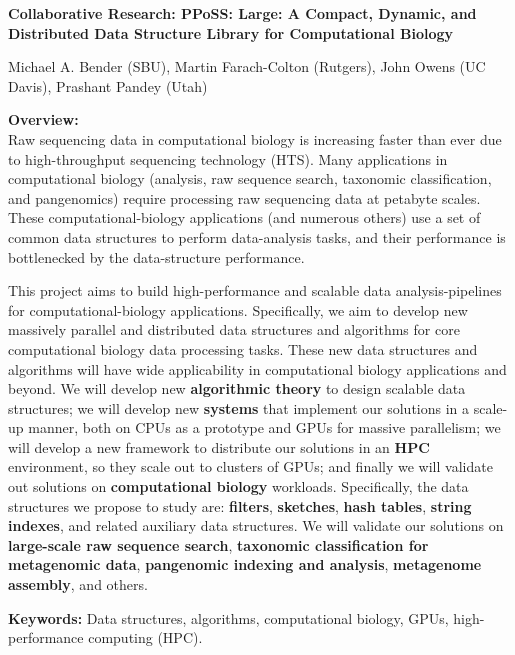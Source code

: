 
\begin{center}
\bf
\Large
Collaborative Research: PPoSS\@: Large: A Compact, Dynamic, and Distributed Data
Structure Library for Computational Biology

\medskip
\small
Michael A. Bender (SBU), Martin Farach-Colton (Rutgers), John Owens (UC Davis), Prashant Pandey (Utah)
\end{center}

\noindent \textbf{\large Overview:}\\
Raw sequencing data in computational biology is increasing faster than ever due to high-throughput sequencing technology (HTS).
Many applications in computational biology (\kmer analysis, raw sequence search, taxonomic classification, and pangenomics) require processing raw sequencing data at petabyte scales.
%
These computational-biology applications (and numerous others) use a set of common data structures to perform data-analysis tasks, and their performance is bottlenecked by  the data-structure performance.

This project aims to build high-performance and scalable data analysis-pipelines for computational-biology applications. Specifically, we aim to develop new massively parallel and distributed data structures and algorithms for core computational biology data processing tasks. These new data structures and algorithms will have wide applicability in computational biology applications and beyond.
%
We will develop new \textbf{algorithmic theory} to design scalable data structures; we will develop new \textbf{systems} that implement our solutions in a scale-up manner,  both on CPUs as a prototype and GPUs for massive parallelism; we will develop a new framework to distribute our solutions in an \textbf{HPC} environment, so they scale out to clusters of GPUs; and finally we will validate out solutions on \textbf{computational biology} workloads.
%
Specifically, the data structures we propose to study are: \textbf{filters}, \textbf{sketches}, \textbf{hash tables}, \textbf{string indexes}, and related auxiliary data structures.  We will validate our solutions on \textbf{large-scale raw sequence search}, \textbf{taxonomic classification for metagenomic data}, \textbf{pangenomic indexing and analysis}, \textbf{metagenome assembly}, and others.

\noindent \textbf{\large Keywords:} Data structures, algorithms, computational biology, GPUs, high-performance computing (HPC).


